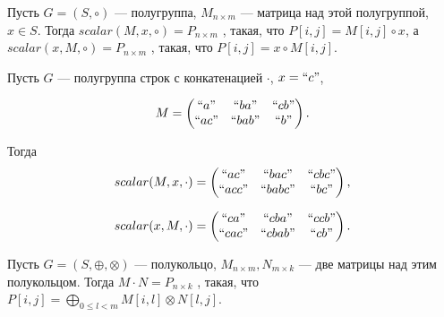 \begin{definition}
Пусть $G = (S,\circ)$ --- полугруппа, $M_{n \times m}$ --- матрица над этой полугруппой, $x \in S$.
Тогда
$
scalar(M,x,\circ) = P_{n \times m}
$
, такая, что $P[i,j] = M[i,j] \circ x$, а
$
scalar(x,M,\circ) = P_{n \times m}
$
, такая, что $P[i,j] = x \circ M[i,j]$.

\end{definition}

\begin{example}

Пусть $G$ --- полугруппа строк с конкатенацией $\cdot$, $x = ``c"$,

$$
M =
\begin{pmatrix}
``a"  & ``ba"  & ``cb" \\
``ac" & ``bab" & ``b"  \\
\end{pmatrix}.
$$

Тогда
$$
scalar(M,x, \cdot) =
\begin{pmatrix}
``ac"  & ``bac"  & ``cbc" \\
``acc" & ``babc" & ``bc"  \\
\end{pmatrix},
$$

$$
scalar(x, M, \cdot) =
\begin{pmatrix}
``ca"  & ``cba"  & ``ccb" \\
``cac" & ``cbab" & ``cb"  \\
\end{pmatrix}.
$$

\end{example}


\begin{definition}\label{def:MxM}

Пусть $G = (S,\oplus, \otimes)$ --- полукольцо, $M_{n \times m}, N_{m\times k}$ --- две матрицы над этим полукольцом.
Тогда
$
M\cdot N = P_{n \times k}
$
, такая, что $P[i,j] = \bigoplus_{0 \leq l < m} M[i,l] \otimes N[l,j]$.

\end{definition}

